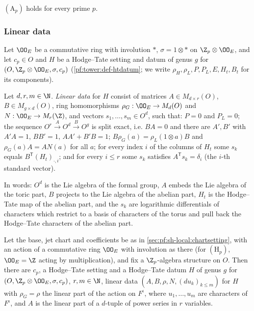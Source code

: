 \begin{theorem}\label{pf:sh-local:Ap}
$(\mathrm A_p)$ holds for every prime $p$.
\end{theorem}

\subsubsection{Linear data}
Let $\OO_E$ be a commutative ring with involution $*$, $\sigma=1\otimes*$ on $\Z_p\otimes\OO_E$, and let $c_p\in O$
and $H$ be a Hodge--Tate setting and datum of genus $g$ for $(O,\Z_p\otimes\OO_E,\sigma,c_p)$ (\cref{pf:tower:def-htdatum};
we write $\rho_H,\rho_{L},P,P_L,E,H_t,B_t$ for its components).

\begin{definition}\label{pf:sh-local:def:lindat}
Let $d,r,m\in\N$. \emph{Linear data} for $H$ consist of matrices $A\in M_{d\times r}(O)$, $B\in M_{g\times d}(O)$,
ring homomorphisms $\rho_G:\OO_E\to M_d(O)$ and $N:\OO_E\to M_r(\Z)$, and vectors $s_1,\dots,s_m\in O^d$, such that:
$P=0$ and $P_L=0$; the sequence $O^r\xrightarrow{A}O^d\xrightarrow{B}O^g$ is split exact, i.e. $BA=0$ and there are
$A',B'$ with $A'A=1$, $BB'=1$, $AA'+B'B=1$; $B\rho_G(a)=\rho_L(1\otimes a)B$ and $\rho_G(a)A=AN(a)$ for all $a$;
for every index $i$ of the columns of $H_t$ some $s_k$ equals $B^{\mathsf T}(H_t)_{\cdot,i}$; and for every
$i\le r$ some $s_k$ satisfies $A^{\mathsf T}s_k=\delta_i$ (the $i$-th standard vector).
\end{definition}

In words: $O^d$ is the Lie algebra of the formal group, $A$ embeds the Lie algebra of the toric part, $B$ projects to
the Lie algebra of the abelian part, $H_t$ is the Hodge--Tate map of the abelian part, and the $s_k$ are logarithmic
differentials of characters which restrict to a basis of characters of the torus and pull back the Hodge--Tate
characters of the abelian part.

\begin{proposition}\label{pf:sh-local:lindatex}
Let the base, jet chart and coefficients be as in \cref{sec:pf:sh-local:chartsetting}, with an action of a
commutative ring $\OO_E$ with involution as there (for $(\mathrm H_p)$, $\OO_E=\Z$ acting by multiplication), and fix
a $\Z_p$-algebra structure on $O$. Then there are $c_p$, a Hodge--Tate setting and a Hodge--Tate datum $H$ of genus
$g$ for $(O,\Z_p\otimes\OO_E,\sigma,c_p)$, $r,m\in\N$, linear data $(A,B,\rho,N,(du_k)_{k\le m})$ for $H$ with
$\rho_G=\rho$ the linear part of the action on $F^\iota$, where $u_1,\dots,u_m$ are characters of $F^\iota$, and
$A$ is the linear part of a $d$-tuple of power series in $r$ variables.
\end{proposition}

